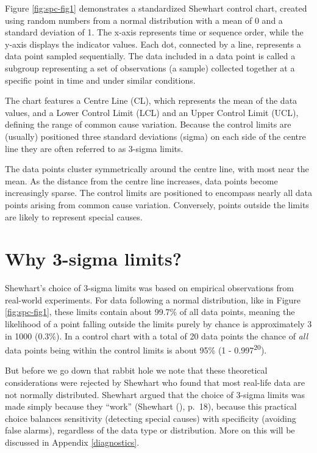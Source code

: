 \documentclass[
]{book}
\begin{document}
Figure \ref{fig:spc-fig1} demonstrates a standardized Shewhart control chart, created using random numbers from a normal distribution with a mean of 0 and a standard deviation of 1. The x-axis represents time or sequence order, while the y-axis displays the indicator values. Each dot, connected by a line, represents a data point sampled sequentially. The data included in a data point is called a subgroup representing a set of observations (a sample) collected together at a specific point in time and under similar conditions.

The chart features a Centre Line (CL), which represents the mean of the data values, and a Lower Control Limit (LCL) and an Upper Control Limit (UCL), defining the range of common cause variation. Because the control limits are (usually) positioned three standard deviations (sigma) on each side of the centre line they are often referred to as 3-sigma limits.

The data points cluster symmetrically around the centre line, with most near the mean. As the distance from the centre line increases, data points become increasingly sparse. The control limits are positioned to encompass nearly all data points arising from common cause variation. Conversely, points outside the limits are likely to represent special causes.

\section{Why 3-sigma limits?}\label{why-3-sigma-limits}

Shewhart's choice of 3-sigma limits was based on empirical observations from real-world experiments. For data following a normal distribution, like in Figure \ref{fig:spc-fig1}, these limits contain about 99.7\% of all data points, meaning the likelihood of a point falling outside the limits purely by chance is approximately 3 in 1000 (0.3\%). In a control chart with a total of 20 data points the chance of \emph{all} data points being within the control limits is about 95\% (1 - 0.997\textsuperscript{20}).

But before we go down that rabbit hole we note that these theoretical considerations were rejected by Shewhart who found that most real-life data are not normally distributed. Shewhart argued that the choice of 3-sigma limits was made simply because they ``work'' (Shewhart (), p.~18), because this practical choice balances sensitivity (detecting special causes) with specificity (avoiding false alarms), regardless of the data type or distribution. More on this will be discussed in Appendix \ref{diagnostics}.
\end{document}

